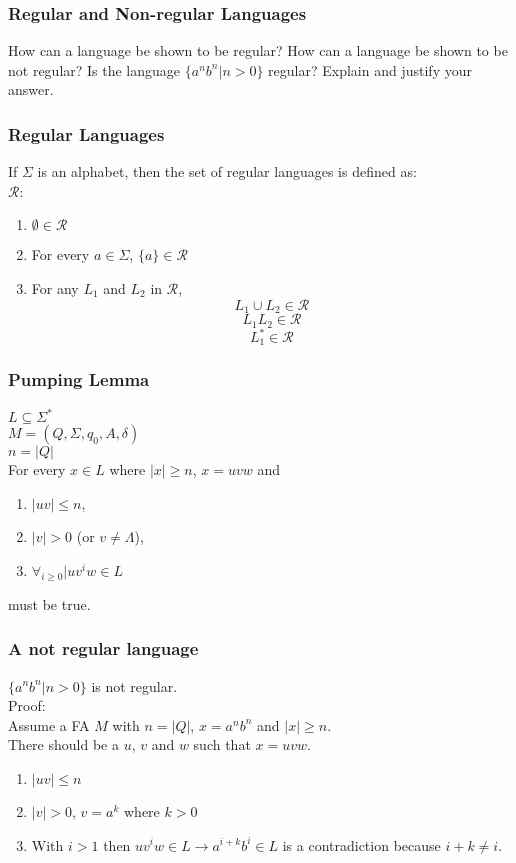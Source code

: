 

\begin{frame}
    \frametitle{Regular and Non-regular Languages}
    How can a language be shown to be regular? How can a language be shown to
    be not regular? Is the language $\{a^nb^n | n > 0 \}$ regular? Explain and
    justify your answer.
\end{frame}

\begin{frame}
    \frametitle{Regular Languages}
    If $\Sigma$ is an alphabet, then the set of regular languages is defined
    as:\\
    $\mathcal{R}$:
    \begin{enumerate}
        \item $\emptyset \in \mathcal{R}$
        \item For every $a \in \Sigma$, $\{a\} \in \mathcal{R}$
        \item For any $L_1$ and $L_2$ in $\mathcal{R}$,
            \[L_1 \cup L_2 \in \mathcal{R}\]
            \[L_1 L_2 \in \mathcal{R}\]
            \[L_1^\ast \in \mathcal{R}\]
    \end{enumerate}
\end{frame}

\begin{frame}
    \frametitle{Pumping Lemma}
    $L \subseteq \Sigma^\ast$\\
    $M = (Q, \Sigma, q_0, A, \delta)$\\
    $n = |Q|$\\

    \vspace{10 pt}
    For every $x \in L$ where $|x| \geq n$, $x = uvw$ and
    \begin{enumerate}
        \item $|uv| \leq n$,
        \item $|v| > 0$ (or $v \neq \Lambda$),
        \item $\forall_{i \geq 0} | uv^iw \in L$
    \end{enumerate}
    must be true.
\end{frame}

\begin{frame}
    \frametitle{A not regular language}
    $\{a^n b^n | n > 0 \}$ is not regular.\\
    \vspace{10 pt}
    Proof:\\
    Assume a FA $M$ with $n = |Q|$, $x = a^n b^n$ and $|x| \geq n$.\\
    There should be a $u$, $v$ and $w$ such that $x = uvw$.
    \begin{enumerate}
        \item $|uv| \leq n$
        \item $|v| > 0$, $v = a^k$ where $k > 0$
        \item With $i > 1$ then $uv^iw \in L \rightarrow a^{i+k}b^i \in L$ is a
            contradiction because $i+k \neq i$.
    \end{enumerate}
\end{frame}


